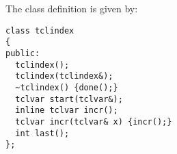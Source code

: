 The class definition is given by:
\begin{verbatim}
class tclindex  
{
public:
  tclindex();
  tclindex(tclindex&);
  ~tclindex() {done();}
  tclvar start(tclvar&);
  inline tclvar incr();
  tclvar incr(tclvar& x) {incr();}  
  int last();
};
\end{verbatim}





